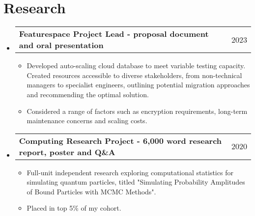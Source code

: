 \documentclass[letterpaper,11pt]{article}
\makeatletter
\newcommand{\resumeItem}[1]{
  \item\small{
    {#1 \vspace{-2pt}}
  }
}
\newcommand{\resumeSubheading}[4]{
  \vspace{-2pt}\item
    \begin{tabular*}{0.97\textwidth}[t]{l@{\extracolsep{\fill}}r}
      \textbf{#1} & #2 \\ %
    \end{tabular*}\vspace{-7pt}
}
\newcommand{\resumeSubHeadingListStart}{\begin{itemize}[leftmargin=0.15in, label={}]}
\newcommand{\resumeSubHeadingListEnd}{\end{itemize}}
\newcommand{\resumeItemListStart}{\begin{itemize}}
\newcommand{\resumeItemListEnd}{\end{itemize}\vspace{-5pt}}
\makeatother
\begin{document}
\section{Research}
  \vspace{3pt}
  \resumeSubHeadingListStart
    \resumeSubheading
      {Featurespace Project Lead - proposal document and oral presentation}{2023}
      {}{}
      \resumeItemListStart
        \resumeItem{Developed auto-scaling cloud database to meet variable testing capacity. Created resources accessible to diverse stakeholders, from non-technical managers to specialist engineers, outlining potential migration approaches and recommending the optimal solution.}
        \resumeItem{Considered a range of factors such as encryption requirements, long-term maintenance concerns and scaling costs.}
      \resumeItemListEnd
    \resumeSubheading
      {Computing Research Project - 6,000 word research report, poster and Q\&A}{2020}
      {}{}
      \resumeItemListStart
        \resumeItem{Full-unit independent research exploring computational statistics for simulating quantum particles, titled "Simulating Probability Amplitudes of Bound Particles with MCMC Methods".}
        \resumeItem{Placed in top 5\% of my cohort.}
      \resumeItemListEnd
  \resumeSubHeadingListEnd


\end{document}
